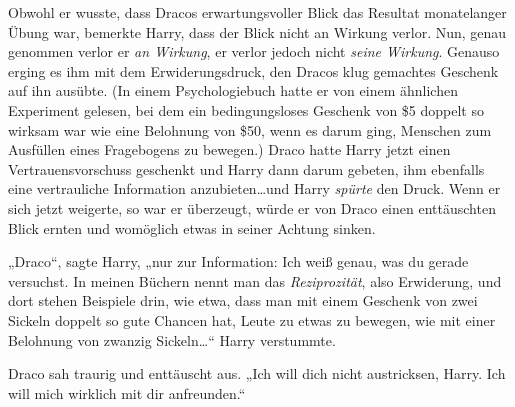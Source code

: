 Obwohl er wusste, dass Dracos erwartungsvoller Blick das Resultat monatelanger Übung war, bemerkte Harry, dass der Blick nicht an Wirkung verlor. Nun, genau genommen verlor er \emph{an Wirkung}, er verlor jedoch nicht \emph{seine Wirkung}. Genauso erging es ihm mit dem Erwiderungsdruck, den Dracos klug gemachtes Geschenk auf ihn ausübte. (In einem Psychologiebuch hatte er von einem ähnlichen Experiment gelesen, bei dem ein bedingungsloses Geschenk von \$5 doppelt so wirksam war wie eine Belohnung von \$50, wenn es darum ging, Menschen zum Ausfüllen eines Fragebogens zu bewegen.) Draco hatte Harry jetzt einen Vertrauensvorschuss geschenkt und Harry dann darum gebeten, ihm ebenfalls eine vertrauliche Information anzubieten…und Harry \emph{spürte} den Druck. Wenn er sich jetzt weigerte, so war er überzeugt, würde er von Draco einen enttäuschten Blick ernten und womöglich etwas in seiner Achtung sinken.

„Draco“, sagte Harry, „nur zur Information: Ich weiß genau, was du gerade versuchst. In meinen Büchern nennt man das \emph{Reziprozität}, also Erwiderung, und dort stehen Beispiele drin, wie etwa, dass man mit einem Geschenk von zwei Sickeln doppelt so gute Chancen hat, Leute zu etwas zu bewegen, wie mit einer Belohnung von zwanzig Sickeln…“ Harry verstummte.

Draco sah traurig und enttäuscht aus. „Ich will dich nicht austricksen, Harry. Ich will mich wirklich mit dir anfreunden.“

